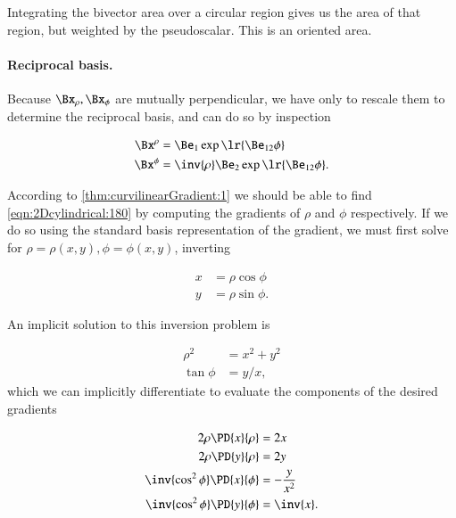 Integrating the bivector area over a circular region gives us the area of that region, but weighted by the  pseudoscalar.  This is an oriented area.

\paragraph{Reciprocal basis.}
Because \( \Bx_\rho, \Bx_\phi \) are mutually perpendicular, we have only to rescale them to determine the reciprocal basis, and can do so by inspection

\begin{dmath}\label{eqn:2Dcylindrical:180}
\begin{aligned}
\Bx^\rho &= \Be_1 \exp\lr{ \Be_{12} \phi } \\
\Bx^\phi &= \inv{\rho} \Be_2 \exp\lr{ \Be_{12} \phi }.
\end{aligned}
\end{dmath}

According to \cref{thm:curvilinearGradient:1}
we should be able to find \cref{eqn:2Dcylindrical:180} by computing the gradients of \( \rho \) and \( \phi \) respectively.
If we do so using the  standard basis representation of the gradient, we must first solve for \( \rho = \rho(x,y), \phi = \phi(x,y) \), inverting

\begin{dmath}\label{eqn:2Dcylindrical:620}
\begin{aligned}
x &= \rho \cos\phi \\
y &= \rho \sin\phi.
\end{aligned}
\end{dmath}

An implicit solution to this inversion problem is

\begin{dmath}\label{eqn:2Dcylindrical:500}
\begin{aligned}
\rho^2 &= x^2 + y^2 \\
\tan\phi &= y/x,
\end{aligned}
\end{dmath}
which we can implicitly differentiate to evaluate the components of the desired gradients

\begin{dmath}\label{eqn:2Dcylindrical:520}
\begin{aligned}
2 \rho \PD{x}{\rho} &= 2 x \\
2 \rho \PD{y}{\rho} &= 2 y \\
\inv{\cos^2\phi} \PD{x}{\phi} &= -\frac{y}{x^2} \\
\inv{\cos^2\phi} \PD{y}{\phi} &= \inv{x}.
\end{aligned}
\end{dmath}

